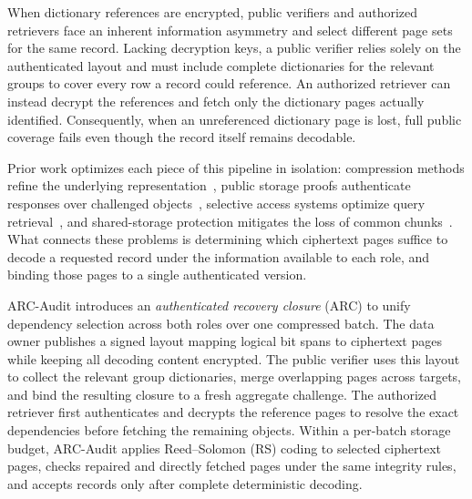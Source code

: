 \documentclass[10pt,journal]{IEEEtran}
\begin{document}
When dictionary references are encrypted, public verifiers and authorized retrievers face an inherent information asymmetry and select different page sets for the same record. Lacking decryption keys, a public verifier relies solely on the authenticated layout and must include complete dictionaries for the relevant groups to cover every row a record could reference. An authorized retriever can instead decrypt the references and fetch only the dictionary pages actually identified. Consequently, when an unreferenced dictionary page is lost, full public coverage fails even though the record itself remains decodable.

Prior work optimizes each piece of this pipeline in isolation: compression methods refine the underlying representation~\cite{Hurst2024GreedyGD}, public storage proofs authenticate responses over challenged objects~\cite{ShachamWaters2013}, selective access systems optimize query retrieval~\cite{Taurone2024TREAT}, and shared-storage protection mitigates the loss of common chunks~\cite{Bhagwat2006Reliability}. What connects these problems is determining which ciphertext pages suffice to decode a requested record under the information available to each role, and binding those pages to a single authenticated version.

ARC-Audit introduces an \emph{authenticated recovery closure} (ARC) to unify dependency selection across both roles over one compressed batch. The data owner publishes a signed layout mapping logical bit spans to ciphertext pages while keeping all decoding content encrypted. The public verifier uses this layout to collect the relevant group dictionaries, merge overlapping pages across targets, and bind the resulting closure to a fresh aggregate challenge. The authorized retriever first authenticates and decrypts the reference pages to resolve the exact dependencies before fetching the remaining objects. Within a per-batch storage budget, ARC-Audit applies Reed--Solomon (RS) coding to selected ciphertext pages, checks repaired and directly fetched pages under the same integrity rules, and accepts records only after complete deterministic decoding.
\end{document}
